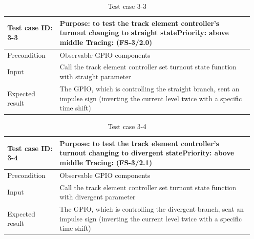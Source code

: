 \begin{table}[H]
	\caption{Test case 3-3}
	\label{table:TCase-FS3-3}
	\begin{center}
		\renewcommand{\arraystretch}{1.8}
		\begin{tabu} 
			to 0.9 \textwidth
			{  X[0.3, l] X[l] }
			\toprule
			Test case ID: 3-3 & Purpose: to test the track element controller's turnout changing to straight state\newline Priority: above middle \newline Tracing: (FS-3/2.0) \\ \midrule
			Precondition      & Observable GPIO components                                                                                                                     \\
			Input             & Call the track element controller set turnout state function with straight parameter                                                           \\
			Expected result   & The GPIO, which is controlling the straight branch, sent an impulse sign (inverting the current level twice with a specific time shift)     \\ \bottomrule
		\end{tabu}
	\end{center}
\end{table}

\begin{table}[H]
	\caption{Test case 3-4}
	\label{table:TCase-FS3-4}
	\begin{center}
		\renewcommand{\arraystretch}{1.8}
		\begin{tabu} 
			to 0.9 \textwidth
			{  X[0.3, l] X[l] }
			\toprule
			Test case ID: 3-4 & Purpose: to test the track element controller's turnout changing to divergent state\newline Priority: above middle \newline Tracing: (FS-3/2.1) \\ \midrule
			Precondition      & Observable GPIO components                                                                                                                      \\
			Input             & Call the track element controller set turnout state function with divergent parameter                                                           \\
			Expected result   & The GPIO, which is controlling the divergent branch, sent an impulse sign (inverting the current level twice with a specific time shift)        \\ \bottomrule
		\end{tabu}
	\end{center}
\end{table}

